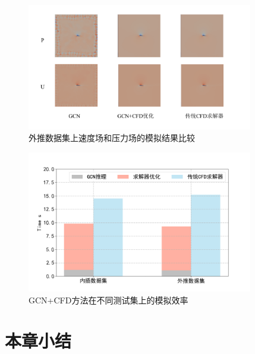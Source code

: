 \begin{figure}[htp]
	\centering
	\includegraphics[width=0.88\textwidth]{figures/gcn_result/chapter4/gcncomp.png}
	\caption{外推数据集上速度场和压力场的模拟结果比较}
	\label{fig:outerresult}
\end{figure}


\begin{figure}[htp]
	\centering
	\includegraphics[width=0.88\textwidth]{figures/gcn_result/time.png}
	\caption{GCN+CFD方法在不同测试集上的模拟效率}
	\label{fig:timeresult}
\end{figure}





\section{本章小结}

